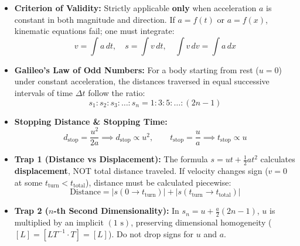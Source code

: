 \documentclass[11pt,a4paper]{article}
\begin{document}
\begin{usecasebox}
\begin{itemize}
  \item \textbf{Criterion of Validity:} Strictly applicable \textbf{only} when acceleration $a$ is constant in both magnitude and direction. If $a = f(t)$ or $a = f(x)$, kinematic equations fail; one must integrate:
  \begin{equation*}
    v = \int a\,dt, \quad s = \int v\,dt, \quad \int v\,dv = \int a\,dx
  \end{equation*}
  \item \textbf{Galileo's Law of Odd Numbers:} For a body starting from rest ($u=0$) under constant acceleration, the distances traversed in equal successive intervals of time $\Delta t$ follow the ratio:
  \begin{equation*}
    s_1 : s_2 : s_3 : \dots : s_n = 1 : 3 : 5 : \dots : (2n - 1)
  \end{equation*}
  \item \textbf{Stopping Distance \& Stopping Time:}
  \begin{equation*}
    d_{\text{stop}} = \frac{u^2}{2a} \implies d_{\text{stop}} \propto u^2, \qquad t_{\text{stop}} = \frac{u}{a} \implies t_{\text{stop}} \propto u
  \end{equation*}
\end{itemize}
\end{usecasebox}

\begin{trapbox}
\begin{itemize}
  \item \textbf{Trap 1 (Distance vs Displacement):} The formula $s = ut + \frac{1}{2}at^2$ calculates \textbf{displacement}, NOT total distance traveled. If velocity changes sign ($v=0$ at some $t_{\text{turn}} < t_{\text{total}}$), distance must be calculated piecewise:
  \begin{equation*}
    \text{Distance} = |s(0 \to t_{\text{turn}})| + |s(t_{\text{turn}} \to t_{\text{total}})|
  \end{equation*}
  \item \textbf{Trap 2 ($n$-th Second Dimensionality):} In $s_n = u + \frac{a}{2}(2n-1)$, $u$ is multiplied by an implicit $(1\text{ s})$, preserving dimensional homogeneity ($[L] = [LT^{-1} \cdot T] = [L]$). Do not drop signs for $u$ and $a$.
\end{itemize}
\end{trapbox}
\end{document}
